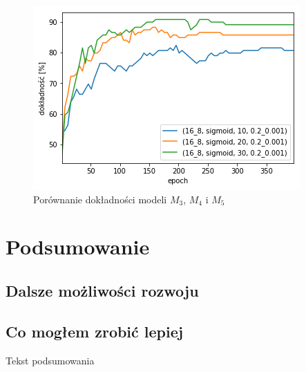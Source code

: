 \documentclass{report}
\begin{document}
    \begin{figure}[h]
        \centering
        \includegraphics[scale=0.8]{././img/feat-accuracy.png}
        \caption{Porównanie dokładności modeli $M_3$, $M_4$ i $M_5$}
    \end{figure}

    \chapter{Podsumowanie}\label{ch:podsumowanie}

    \section{Dalsze możliwości rozwoju}\label{sec:dalszeMozliwosciRozwoju}

    \section{Co mogłem zrobić lepiej}\label{sec:coMoglemZrobicLepiej}

    Tekst podsumowania

    
    

    \listoffigures
    \listoftables
\end{document}
